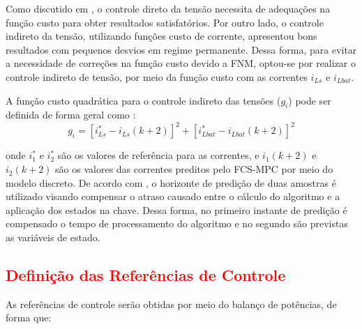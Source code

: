 Como discutido em \cite{braga2022controle}, o controle direto da tensão necessita de adequações na função custo para obter resultados satisfatórios. Por outro lado, o controle indireto da tensão, utilizando funções custo de corrente, apresentou bons resultados com pequenos desvios em regime permanente. Dessa forma, para evitar a necessidade de correções na função custo devido a FNM, optou-se por realizar o controle indireto de tensão, por meio da função custo com as correntes $i_{Ls}$ e $i_{Lbat}$. 

A função custo quadrática para o controle indireto das tensões ($g_i$) pode ser definida de forma geral como : 
\begin{equation}
    g_i = [i^*_{Ls}-i_{Ls}(k+2)]^2 + [i^*_{Lbat}-i_{Lbat}(k+2)]^2
\end{equation}


\noindent onde $i^*_1$ e $i^*_2$ são os valores de referência para as correntes, e $i_1(k+2)$ e $i_2(k+2)$ são os valores das correntes preditos pelo FCS-MPC por meio do modelo discreto. De acordo com \cite{delay}, o horizonte de predição de duas amostras é utilizado visando compensar o atraso causado entre o cálculo do algoritmo e a aplicação dos estados na chave. Dessa forma, no primeiro instante de predição é compensado o tempo de processamento do algoritmo e no segundo são previstas as variáveis de estado. 

\subsection{\textcolor{red}{Definição das Referências de Controle} }




As referências de controle serão obtidas por meio do balanço de potências, de forma que: 

